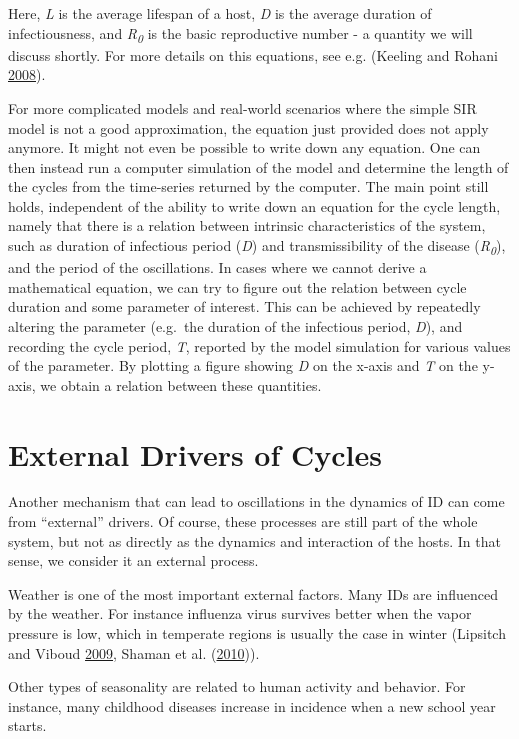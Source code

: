 \documentclass[]{book}
\theoremstyle{definition}
\theoremstyle{definition}
\theoremstyle{definition}
\theoremstyle{remark}
\begin{document}
Here, \emph{L} is the average lifespan of a host, \emph{D} is the
average duration of infectiousness, and \emph{R\textsubscript{0}} is the
basic reproductive number - a quantity we will discuss shortly. For more
details on this equations, see e.g. (Keeling and Rohani
\protect\hyperlink{ref-keeling08}{2008}).

For more complicated models and real-world scenarios where the simple
SIR model is not a good approximation, the equation just provided does
not apply anymore. It might not even be possible to write down any
equation. One can then instead run a computer simulation of the model
and determine the length of the cycles from the time-series returned by
the computer. The main point still holds, independent of the ability to
write down an equation for the cycle length, namely that there is a
relation between intrinsic characteristics of the system, such as
duration of infectious period (\emph{D}) and transmissibility of the
disease (\emph{R\textsubscript{0}}), and the period of the oscillations.
In cases where we cannot derive a mathematical equation, we can try to
figure out the relation between cycle duration and some parameter of
interest. This can be achieved by repeatedly altering the parameter
(e.g.~the duration of the infectious period, \emph{D}), and recording
the cycle period, \emph{T}, reported by the model simulation for various
values of the parameter. By plotting a figure showing \emph{D} on the
x-axis and \emph{T} on the y-axis, we obtain a relation between these
quantities.

\section{External Drivers of Cycles}\label{external-drivers-of-cycles}

Another mechanism that can lead to oscillations in the dynamics of ID
can come from ``external'' drivers. Of course, these processes are still
part of the whole system, but not as directly as the dynamics and
interaction of the hosts. In that sense, we consider it an external
process.

Weather is one of the most important external factors. Many IDs are
influenced by the weather. For instance influenza virus survives better
when the vapor pressure is low, which in temperate regions is usually
the case in winter (Lipsitch and Viboud
\protect\hyperlink{ref-lipsitch09}{2009}, Shaman et al.
(\protect\hyperlink{ref-shaman10}{2010})).

Other types of seasonality are related to human activity and behavior.
For instance, many childhood diseases increase in incidence when a new
school year starts.
\end{document}
